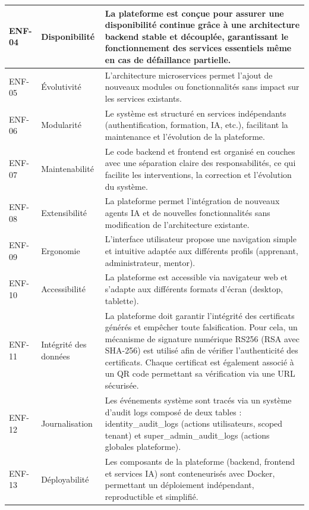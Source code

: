\begin{longtable}{|p{1.2cm}|p{2.8cm}|p{11cm}|}
ENF-04 & Disponibilité & La plateforme est conçue pour assurer une disponibilité continue grâce à une architecture backend stable et découplée, garantissant le fonctionnement des services essentiels même en cas de défaillance partielle. \\
\hline

ENF-05 & Évolutivité & L'architecture microservices permet l'ajout de nouveaux modules ou fonctionnalités sans impact sur les services existants. \\
\hline

ENF-06 & Modularité & Le système est structuré en services indépendants (authentification, formation, IA, etc.), facilitant la maintenance et l'évolution de la plateforme. \\
\hline

ENF-07 & Maintenabilité & Le code backend et frontend est organisé en couches avec une séparation claire des responsabilités, ce qui facilite les interventions, la correction et l'évolution du système. \\
\hline

ENF-08 & Extensibilité & La plateforme permet l'intégration de nouveaux agents IA et de nouvelles fonctionnalités sans modification de l'architecture existante. \\
\hline

ENF-09 & Ergonomie & L'interface utilisateur propose une navigation simple et intuitive adaptée aux différents profils (apprenant, administrateur, mentor). \\
\hline

ENF-10 & Accessibilité & La plateforme est accessible via navigateur web et s'adapte aux différents formats d'écran (desktop, tablette). \\
\hline

ENF-11 & Intégrité des données & La plateforme doit garantir l'intégrité des certificats générés et empêcher toute falsification. Pour cela, un mécanisme de signature numérique RS256 (RSA avec SHA-256) est utilisé afin de vérifier l'authenticité des certificats. Chaque certificat est également associé à un QR code permettant sa vérification via une URL sécurisée. \\
\hline

ENF-12 & Journalisation & Les événements système sont tracés via un système d'audit logs composé de deux tables : identity\_audit\_logs (actions utilisateurs, scoped tenant) et super\_admin\_audit\_logs (actions globales plateforme). \\
\hline

ENF-13 & Déployabilité & Les composants de la plateforme (backend, frontend et services IA) sont conteneurisés avec Docker, permettant un déploiement indépendant, reproductible et simplifié. \\
\hline

\end{longtable}


